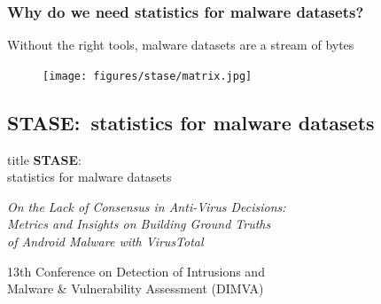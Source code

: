 \begin{frame}
    \frametitle{Why do we need statistics for malware datasets?}
    \centering

    Without the right tools, malware datasets are a stream of bytes

    \begin{figure}[!ht]
        \texttt{[image: figures/stase/matrix.jpg]}
    \end{figure}

\end{frame}

\subsection[STASE]{STASE:~statistics for malware datasets}

\begin{frame}
    \vfill
    \centering

    \begin{beamercolorbox}[sep=8pt,center,shadow=true,rounded=true]{title}
        \textbf{STASE}:\\
        statistics for malware datasets

        \small{}

        \bigskip{}

        \textit{
            On the Lack of Consensus in Anti-Virus Decisions:\\
            Metrics and Insights on Building Ground Truths \\
            of Android Malware with VirusTotal
        }
            
        \bigskip{}

        13th Conference on Detection of Intrusions and \\
        Malware \& Vulnerability Assessment (DIMVA)
    \end{beamercolorbox}

    \vfill
\end{frame}


